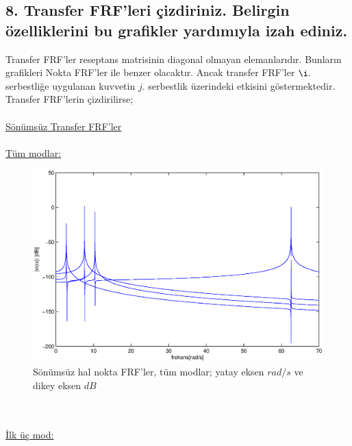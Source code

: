\documentclass[a4paper]{report}
\begin{document}
\subsection*{8. Transfer FRF'leri çizdiriniz. Belirgin özelliklerini bu grafikler yardımıyla izah ediniz.}
Transfer FRF'ler reseptans matrisinin diagonal olmayan elemanlarıdır. Bunların grafikleri Nokta FRF'ler ile benzer olacaktır. Ancak transfer FRF'ler $\i.$ serbestliğe uygulanan kuvvetin $j.$ serbestlik üzerindeki etkisini göstermektedir. Transfer FRF'lerin çizdirilirse;\\
~\\
\underline{Sönümsüz Transfer FRF'ler}\\
~\\
\underline{Tüm modlar:}\\
\begin{figure}[H]
\shorthandoff{=}
\centerline{
{\includegraphics[width=1.3\textwidth]{./transferFRF.eps}}}
\caption[Sönümsüz hal nokta FRF'ler]{Sönümsüz hal nokta FRF'ler, tüm modlar; yatay eksen ${rad}/{s}$ ve dikey eksen $dB$ }
\label{fig:noktaFRF}
\end{figure}
~\\
\clearpage~\\
\underline{İlk üç mod:}\\
\end{document}
